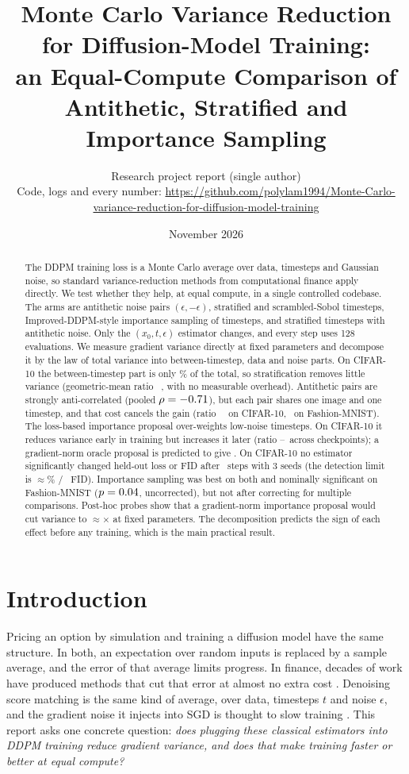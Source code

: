 \documentclass[10pt]{article}
\title{Monte Carlo Variance Reduction for Diffusion-Model Training:\\
an Equal-Compute Comparison of Antithetic, Stratified and Importance Sampling}
\author{Research project report (single author)\\\small Code, logs and every number: \url{https://github.com/polylam1994/Monte-Carlo-variance-reduction-for-diffusion-model-training}}
\date{November 2026}
\begin{document}
\maketitle

\begin{abstract}
The DDPM training loss is a Monte Carlo average over data, timesteps and Gaussian noise, so standard
variance-reduction methods from computational finance apply directly. We test whether they help, at equal
compute, in a single controlled codebase. The arms are antithetic noise pairs $(\epsilon,-\epsilon)$, stratified and
scrambled-Sobol timesteps, Improved-DDPM-style importance sampling of timesteps, and stratified timesteps with
antithetic noise. Only the $(x_0,t,\epsilon)$ estimator changes, and every step uses 128 evaluations. We
measure gradient variance directly at fixed parameters and decompose it by the law of total variance into
between-timestep, data and noise parts. On CIFAR-10 the between-timestep part is only \DecT\% of the total, so
stratification removes little variance (geometric-mean ratio \StratVRall\ \StratVRci, with no measurable
overhead). Antithetic pairs are strongly anti-correlated (pooled $\rho=-0.71$), but each pair shares one
image and one timestep, and that cost cancels the gain (ratio \AntiVRall\ \AntiVRci\ on CIFAR-10, \FAntiVRall\
on Fashion-MNIST). The loss-based importance
proposal over-weights low-noise timesteps. On CIFAR-10 it reduces variance early in training but increases it
later (ratio \ImpVRmin--\ImpVRmax\ across checkpoints); a gradient-norm oracle proposal is predicted to give \Decoracle.
On CIFAR-10 no estimator significantly changed held-out loss or FID after \Steps\ steps with 3 seeds (the
detection limit is $\approx$\MDEho\% / \MDEfid\ FID). Importance sampling was best on both and nominally
significant on Fashion-MNIST ($p=0.04$, uncorrected), but not after correcting for multiple comparisons.
Post-hoc probes show that a gradient-norm importance proposal would cut variance to $\approx$\PHOracle$\times$ at
fixed parameters. The decomposition predicts the sign of each effect before any training, which is the main
practical result.
\end{abstract}

\section{Introduction}
Pricing an option by simulation and training a diffusion model have the same structure. In both, an expectation
over random inputs is replaced by a sample average, and the error of that average limits progress. In finance,
decades of work have produced methods that cut that error at almost no extra cost
\citep{glasserman2003,boyle1977,paskov1995,ghs1999}. Denoising score matching \citep{ho2020ddpm} is the same
kind of average, over data, timesteps $t$ and noise $\epsilon$, and the gradient noise it injects into SGD is
thought to slow training \citep{kim2025adaptive}. This report asks one concrete question: \emph{does
plugging these classical estimators into DDPM training reduce gradient variance, and does that make training
faster or better at equal compute?}
\end{document}
